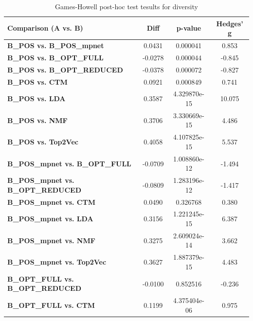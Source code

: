 \begin{table}[ht]
    \centering
    \caption{Games-Howell post-hoc test tesults for diversity}
    \label{tab:games_howell_diversity}
    \begin{tabular}{lccc}
        \toprule
        \textbf{Comparison (A vs. B)}              & \textbf{Diff} & \textbf{p-value} & \textbf{Hedges' g} \\
        \midrule
        \textbf{B\_POS vs. B\_POS\_mpnet}          & 0.0431        & 0.000041         & 0.853              \\
        \textbf{B\_POS vs. B\_OPT\_FULL}           & -0.0278       & 0.000044         & -0.845             \\
        \textbf{B\_POS vs. B\_OPT\_REDUCED}        & -0.0378       & 0.000072         & -0.827             \\
        \textbf{B\_POS vs. CTM}                    & 0.0921        & 0.000849         & 0.741              \\
        \textbf{B\_POS vs. LDA}                    & 0.3587        & 4.329870e-15     & 10.075             \\
        \textbf{B\_POS vs. NMF}                    & 0.3706        & 3.330669e-15     & 4.486              \\
        \textbf{B\_POS vs. Top2Vec}                & 0.4058        & 4.107825e-15     & 5.537              \\
        \textbf{B\_POS\_mpnet vs. B\_OPT\_FULL}    & -0.0709       & 1.008860e-12     & -1.494             \\
        \textbf{B\_POS\_mpnet vs. B\_OPT\_REDUCED} & -0.0809       & 1.283196e-12     & -1.417             \\
        \textbf{B\_POS\_mpnet vs. CTM}             & 0.0490        & 0.326768         & 0.380              \\
        \textbf{B\_POS\_mpnet vs. LDA}             & 0.3156        & 1.221245e-15     & 6.387              \\
        \textbf{B\_POS\_mpnet vs. NMF}             & 0.3275        & 2.609024e-14     & 3.662              \\
        \textbf{B\_POS\_mpnet vs. Top2Vec}         & 0.3627        & 1.887379e-15     & 4.483              \\
        \textbf{B\_OPT\_FULL vs. B\_OPT\_REDUCED}  & -0.0100       & 0.852516         & -0.236             \\
        \textbf{B\_OPT\_FULL vs. CTM}              & 0.1199        & 4.375404e-06     & 0.975              \\

\end{tabular}
\end{table}
